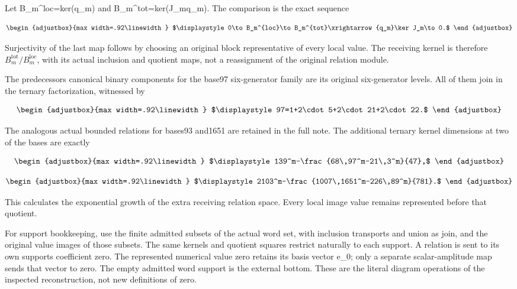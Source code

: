 Let B\_m\^{}loc=ker(q\_m) and B\_m\^{}tot=ker(J\_mq\_m). The comparison is the exact sequence

\[
\begin{adjustbox}{max width=.92\linewidth}
$\displaystyle 0\to B_m^{loc}\to B_m^{tot}\xrightarrow{q_m}\ker J_m\to0.$
\end{adjustbox}
\]

Surjectivity of the last map follows by choosing an original block representative of every local value. The receiving kernel is therefore \(B_m^{\mathrm{tot}}/B_m^{\mathrm{loc}}\), with its actual inclusion and quotient maps, not a reassignment of the original relation module.

The predecessor\textquotesingle s canonical binary components for the base97 six-generator family are its original six-generator levels. All of them join in the ternary factorization, witnessed by

\[
\begin{adjustbox}{max width=.92\linewidth}
$\displaystyle 97=1+2\cdot5+2\cdot21+2\cdot22.$
\end{adjustbox}
\]

The analogous actual bounded relations for bases93 and1651 are retained in the full note. The additional ternary kernel dimensions at two of the bases are exactly

\[
\begin{adjustbox}{max width=.92\linewidth}
$\displaystyle 139^m-\frac{68\,97^m-21\,3^m}{47},$
\end{adjustbox}
\]

\[
\begin{adjustbox}{max width=.92\linewidth}
$\displaystyle 2103^m-\frac{1007\,1651^m-226\,89^m}{781}.$
\end{adjustbox}
\]

This calculates the exponential growth of the extra receiving relation space. Every local image value remains represented before that quotient.

For support bookkeeping, use the finite admitted subsets of the actual word set, with inclusion transports and union as join, and the original value images of those subsets. The same kernels and quotient squares restrict naturally to each support. A relation is sent to its own support\textquotesingle s coefficient zero. The represented numerical value zero retains its basis vector e\_0; only a separate scalar-amplitude map sends that vector to zero. The empty admitted word support is the external bottom. These are the literal diagram operations of the inspected reconstruction, not new definitions of zero.

